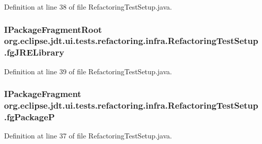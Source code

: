 Definition at line 38 of file RefactoringTestSetup.java.

\hypertarget{classorg_1_1eclipse_1_1jdt_1_1ui_1_1tests_1_1refactoring_1_1infra_1_1RefactoringTestSetup_a201559d9722608a3fabbf28f27df6034}{
\subsubsection[{fgJRELibrary}]{\setlength{\rightskip}{0pt plus 5cm}IPackageFragmentRoot {\bf org.eclipse.jdt.ui.tests.refactoring.infra.RefactoringTestSetup.fgJRELibrary}}}
\label{classorg_1_1eclipse_1_1jdt_1_1ui_1_1tests_1_1refactoring_1_1infra_1_1RefactoringTestSetup_a201559d9722608a3fabbf28f27df6034}


Definition at line 39 of file RefactoringTestSetup.java.

\hypertarget{classorg_1_1eclipse_1_1jdt_1_1ui_1_1tests_1_1refactoring_1_1infra_1_1RefactoringTestSetup_aa895cf3ff04e3cfa6dd633a28f2d48c9}{
\subsubsection[{fgPackageP}]{\setlength{\rightskip}{0pt plus 5cm}IPackageFragment {\bf org.eclipse.jdt.ui.tests.refactoring.infra.RefactoringTestSetup.fgPackageP}}}
\label{classorg_1_1eclipse_1_1jdt_1_1ui_1_1tests_1_1refactoring_1_1infra_1_1RefactoringTestSetup_aa895cf3ff04e3cfa6dd633a28f2d48c9}


Definition at line 37 of file RefactoringTestSetup.java.

